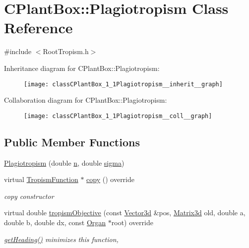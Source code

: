 \hypertarget{classCPlantBox_1_1Plagiotropism}{}\section{C\+Plant\+Box\+:\+:Plagiotropism Class Reference}
\label{classCPlantBox_1_1Plagiotropism}


{\ttfamily \#include $<$Root\+Tropism.\+h$>$}



Inheritance diagram for C\+Plant\+Box\+:\+:Plagiotropism\+:\nopagebreak
\begin{figure}[H]
\begin{center}
\leavevmode
\texttt{[image: classCPlantBox\_1\_1Plagiotropism\_\_inherit\_\_graph]}
\end{center}
\end{figure}


Collaboration diagram for C\+Plant\+Box\+:\+:Plagiotropism\+:\nopagebreak
\begin{figure}[H]
\begin{center}
\leavevmode
\texttt{[image: classCPlantBox\_1\_1Plagiotropism\_\_coll\_\_graph]}
\end{center}
\end{figure}
\subsection*{Public Member Functions}
\begin{DoxyCompactItemize}
\item 
\hyperlink{classCPlantBox_1_1Plagiotropism_a8211f8da1e9a25f68f1bf3eeccc643ac}{Plagiotropism} (double \hyperlink{classCPlantBox_1_1TropismFunction_a619c74d63319c406730c95679784a04a}{n}, double \hyperlink{classCPlantBox_1_1TropismFunction_acdc5f9c3beda0a74ddadd591c5d8afaf}{sigma})
\item 
\mbox{\label{classCPlantBox_1_1Plagiotropism_a21166cbf3f1e28ba6a337da087bfc768}} 
virtual \hyperlink{classCPlantBox_1_1TropismFunction}{Tropism\+Function} $\ast$ \hyperlink{classCPlantBox_1_1Plagiotropism_a21166cbf3f1e28ba6a337da087bfc768}{copy} () override
\begin{DoxyCompactList}\small\item\em copy constructor \end{DoxyCompactList}\item 
virtual double \hyperlink{classCPlantBox_1_1Plagiotropism_a4bd7b5b8a2864e78b06f2f27c7642253}{tropism\+Objective} (const \hyperlink{classCPlantBox_1_1Vector3d}{Vector3d} \&pos, \hyperlink{classCPlantBox_1_1Matrix3d}{Matrix3d} old, double a, double b, double dx, const \hyperlink{classCPlantBox_1_1Organ}{Organ} $\ast$root) override
\begin{DoxyCompactList}\small\item\em \hyperlink{classCPlantBox_1_1TropismFunction_adb52b88734a94fe1365a00e02c7e6be5}{get\+Heading()} minimizes this function, \end{DoxyCompactList}\end{DoxyCompactItemize}
